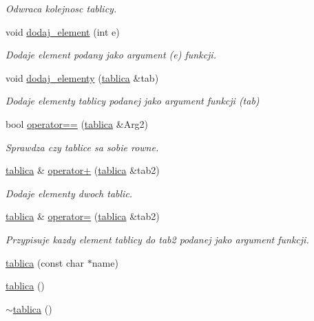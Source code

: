 \begin{DoxyCompactItemize}
\begin{DoxyCompactList}\small\item\em \-Odwraca kolejnosc tablicy. \end{DoxyCompactList}\item 
void \hyperlink{classtablica_aa1f8d3f1ac7cb8a60b305173adb1ef70}{dodaj\-\_\-element} (int e)
\begin{DoxyCompactList}\small\item\em \-Dodaje element podany jako argument (e) funkcji. \end{DoxyCompactList}\item 
void \hyperlink{classtablica_a1df0c5bb98c7a4eccc0cb1fa3662505d}{dodaj\-\_\-elementy} (\hyperlink{classtablica}{tablica} \&tab)
\begin{DoxyCompactList}\small\item\em \-Dodaje elementy tablicy podanej jako argument funkcji (tab) \end{DoxyCompactList}\item 
bool \hyperlink{classtablica_ac45dd9db8adea1f232a1a8b43c9459bd}{operator==} (\hyperlink{classtablica}{tablica} \&\-Arg2)
\begin{DoxyCompactList}\small\item\em \-Sprawdza czy tablice sa sobie rowne. \end{DoxyCompactList}\item 
\hyperlink{classtablica}{tablica} \& \hyperlink{classtablica_abc23806d17b878996403eccdfda6f1ae}{operator+} (\hyperlink{classtablica}{tablica} \&tab2)
\begin{DoxyCompactList}\small\item\em \-Dodaje elementy dwoch tablic. \end{DoxyCompactList}\item 
\hyperlink{classtablica}{tablica} \& \hyperlink{classtablica_af37b5cf937e176c153c85c7f1958ef1d}{operator=} (\hyperlink{classtablica}{tablica} \&tab2)
\begin{DoxyCompactList}\small\item\em \-Przypisuje kazdy element tablicy do tab2 podanej jako argument funkcji. \end{DoxyCompactList}\item 
\hyperlink{classtablica_a399dff7d81480b6b0d1694bda2e66de8}{tablica} (const char $\ast$name)
\item 
\hyperlink{classtablica_abc5414ba4d6321ecf744e38a809d9c8f}{tablica} ()
\item 
\hyperlink{classtablica_a75c3c78102abf0e2b70652c174e02012}{$\sim$tablica} ()
\end{DoxyCompactItemize}
